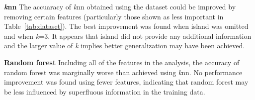 \documentclass[a4paper, 11pt]{article}
\begin{document}
\textbf{\textit{k}nn}  
The accuaracy of \textit{k}nn obtained using the dataset could be improved by removing certain features 
(particularly those shown as less important in Table~\ref{tab:dataset}).
The best improvement was found when island was omitted and when \textit{k}=3. It appears that island did not provide 
any additional information and the larger value of \textit{k} implies better generalization may have been achieved.

\textbf{Random forest}  
Including all of the features in the analysis, the accuracy of random forest was marginally worse 
than achieved using \textit{k}nn. 
No performance improvement was found using fewer features, indicating that random forest
may be less influenced by superfluous information in the training data. 
\end{document}

